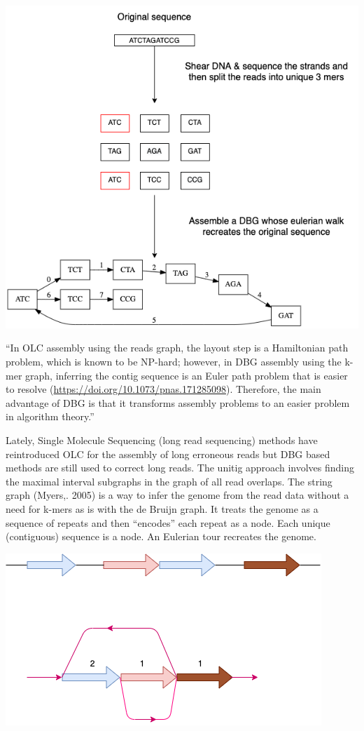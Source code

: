 \documentclass[11pt]{article}
\begin{document}
\begin{center}
\includegraphics[width=.9\linewidth]{./assets/images/de Bruijn Graph.png}
\end{center}

“In OLC assembly using the reads graph, the layout step is a Hamiltonian path 
problem, which is known to be NP-hard; however, in DBG assembly using the k-mer 
graph, inferring the contig sequence is an Euler path problem that is easier to 
resolve (\url{https://doi.org/10.1073/pnas.171285098}). Therefore, the main advantage 
of DBG is that it transforms assembly problems to an easier problem in algorithm 
theory.”

Lately, Single Molecule Sequencing (long read sequencing)  methods have 
reintroduced OLC for the assembly of long erroneous reads but DBG based methods 
are still used to correct long reads.
The unitig approach involves finding the maximal interval subgraphs in the
graph of all read overlaps.
The string graph (Myers,. 2005)  is a way to infer the genome from the read data
without a need for k-mers as is with the de Bruijn graph.  
It treats the genome as a sequence of repeats and then “encodes” each repeat as 
a node. Each unique (contiguous) sequence is a node. 
An Eulerian tour recreates the genome.

\begin{center}
\includegraphics[width=.9\linewidth]{./assets/images/String Graph.png}
\end{center}
\end{document}
